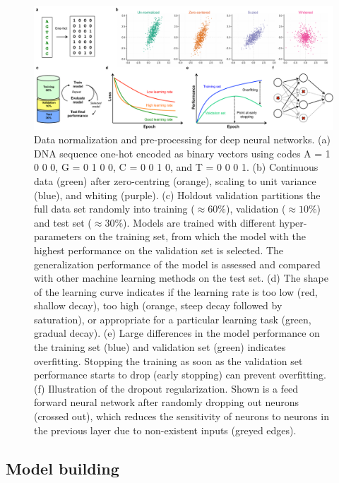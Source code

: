 \begin{figure}[htbp!]
\centering
\includegraphics[width=1.0\textwidth]{tricks}
\caption[Data normalization and pre-processing for deep neural networks.]{Data normalization and pre-processing for deep neural networks. (a) DNA sequence one-hot encoded as binary vectors using codes A = 1 0 0 0, G = 0 1 0 0, C = 0 0 1 0, and T = 0 0 0 1. (b) Continuous data (green) after zero-centring (orange), scaling to unit variance (blue), and whiting (purple). (c) Holdout validation partitions the full data set randomly into training (${\approx}60\%$), validation (${\approx}10\%$) and test set (${\approx}30\%$). Models are trained with different hyper-parameters on the training set, from which the model with the highest performance on the validation set is selected. The generalization performance of the model is assessed and compared with other machine learning methods on the test set. (d) The shape of the learning curve indicates if the learning rate is too low (red, shallow decay), too high (orange, steep decay followed by saturation), or appropriate for a particular learning task (green, gradual decay). (e) Large differences in the model performance on the training set (blue) and validation set (green) indicates overfitting. Stopping the training as soon as the validation set performance starts to drop (early stopping) can prevent overfitting. (f) Illustration of the dropout regularization. Shown is a feed forward neural network after randomly dropping out neurons (crossed out), which reduces the sensitivity of neurons to neurons in the previous layer due to non-existent inputs (greyed edges).}
\label{fig:dl_tricks}
\end{figure}


\subsection{Model building}

